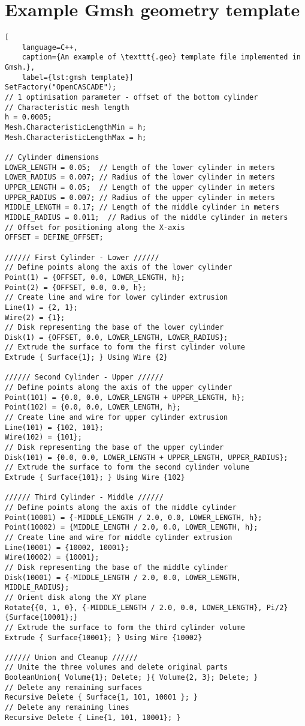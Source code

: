 \chapter{Example Gmsh geometry template}\label{appendix A}

\begin{lstlisting}[
	language=C++,
	caption={An example of \texttt{.geo} template file implemented in Gmsh.},
	label={lst:gmsh template}]
SetFactory("OpenCASCADE");
// 1 optimisation parameter - offset of the bottom cylinder
// Characteristic mesh length
h = 0.0005;
Mesh.CharacteristicLengthMin = h;
Mesh.CharacteristicLengthMax = h;

// Cylinder dimensions
LOWER_LENGTH = 0.05;  // Length of the lower cylinder in meters
LOWER_RADIUS = 0.007; // Radius of the lower cylinder in meters
UPPER_LENGTH = 0.05;  // Length of the upper cylinder in meters
UPPER_RADIUS = 0.007; // Radius of the upper cylinder in meters
MIDDLE_LENGTH = 0.17; // Length of the middle cylinder in meters
MIDDLE_RADIUS = 0.011;  // Radius of the middle cylinder in meters
// Offset for positioning along the X-axis
OFFSET = DEFINE_OFFSET;

////// First Cylinder - Lower //////
// Define points along the axis of the lower cylinder
Point(1) = {OFFSET, 0.0, LOWER_LENGTH, h};
Point(2) = {OFFSET, 0.0, 0.0, h};
// Create line and wire for lower cylinder extrusion
Line(1) = {2, 1};
Wire(2) = {1};
// Disk representing the base of the lower cylinder
Disk(1) = {OFFSET, 0.0, LOWER_LENGTH, LOWER_RADIUS};
// Extrude the surface to form the first cylinder volume
Extrude { Surface{1}; } Using Wire {2}

////// Second Cylinder - Upper //////
// Define points along the axis of the upper cylinder
Point(101) = {0.0, 0.0, LOWER_LENGTH + UPPER_LENGTH, h};
Point(102) = {0.0, 0.0, LOWER_LENGTH, h};
// Create line and wire for upper cylinder extrusion
Line(101) = {102, 101};
Wire(102) = {101};
// Disk representing the base of the upper cylinder
Disk(101) = {0.0, 0.0, LOWER_LENGTH + UPPER_LENGTH, UPPER_RADIUS};
// Extrude the surface to form the second cylinder volume
Extrude { Surface{101}; } Using Wire {102}

////// Third Cylinder - Middle //////
// Define points along the axis of the middle cylinder
Point(10001) = {-MIDDLE_LENGTH / 2.0, 0.0, LOWER_LENGTH, h};
Point(10002) = {MIDDLE_LENGTH / 2.0, 0.0, LOWER_LENGTH, h};
// Create line and wire for middle cylinder extrusion
Line(10001) = {10002, 10001};
Wire(10002) = {10001};
// Disk representing the base of the middle cylinder
Disk(10001) = {-MIDDLE_LENGTH / 2.0, 0.0, LOWER_LENGTH, MIDDLE_RADIUS};
// Orient disk along the XY plane
Rotate{{0, 1, 0}, {-MIDDLE_LENGTH / 2.0, 0.0, LOWER_LENGTH}, Pi/2}{Surface{10001};}
// Extrude the surface to form the third cylinder volume
Extrude { Surface{10001}; } Using Wire {10002}

////// Union and Cleanup //////
// Unite the three volumes and delete original parts
BooleanUnion{ Volume{1}; Delete; }{ Volume{2, 3}; Delete; }
// Delete any remaining surfaces
Recursive Delete { Surface{1, 101, 10001 }; }
// Delete any remaining lines
Recursive Delete { Line{1, 101, 10001}; }
\end{lstlisting}


